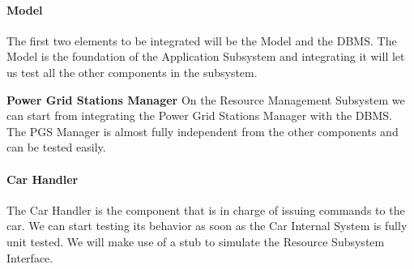 \documentclass[english]{article}
\begin{document}
\paragraph{Model}
The first two elements to be integrated will be the Model and the DBMS.
The Model is the foundation of the Application Subsystem and integrating it will let us test all the other components in the subsystem.

\begin{figure}[H]
	\centering
\end{figure}

\textbf{Power Grid Stations Manager}
On the Resource Management Subsystem we can start from integrating the Power Grid Stations Manager with the DBMS. 
The PGS Manager is almost fully independent from the other components and can be tested easily.
\begin{figure}[H]
	\centering
\end{figure}

\paragraph{Car Handler}

The Car Handler is the component that is in charge of issuing commands to the car. We can start testing its behavior as soon as the Car Internal System is fully unit tested. We will make use of a stub to simulate the Resource Subsystem Interface.

\begin{figure}[H]
	\centering
\end{figure}
\end{document}

